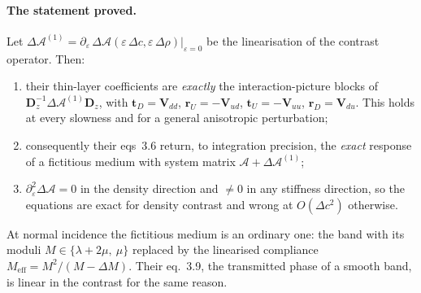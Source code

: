 \documentclass[11pt,a4paper]{article}
\newcommand{\bV}{\mathbf{V}}
\newcommand{\Aop}{\mathcal{A}}
\newcommand{\dA}{\Delta\mathcal{A}}
\begin{document}
\paragraph{The statement proved.}  Let $\dA^{(1)} =
\partial_\varepsilon\,\dA(\varepsilon\,\Delta c,\varepsilon\,\Delta\rho)\big|_{\varepsilon=0}$
be the linearisation of the contrast operator.  Then:
\begin{enumerate}
\item their thin-layer coefficients are \emph{exactly} the interaction-picture
      blocks of $\mathbf{D}_z^{-1}\dA^{(1)}\mathbf{D}_z$, with
      $\mathbf{t}_D = \bV_{dd}$, $\mathbf{r}_U = -\bV_{ud}$,
      $\mathbf{t}_U = -\bV_{uu}$, $\mathbf{r}_D = \bV_{du}$.  This holds at every
      slowness and for a general anisotropic perturbation;
\item consequently their eqs~3.6 return, to integration precision, the
      \emph{exact} response of a fictitious medium with system matrix
      $\Aop + \dA^{(1)}$;
\item $\partial^2_\varepsilon\dA = 0$ in the density direction and $\neq 0$ in
      any stiffness direction, so the equations are exact for density contrast
      and wrong at $O(\Delta c^2)$ otherwise.
\end{enumerate}
At normal incidence the fictitious medium is an ordinary one: the band with its
moduli $M\in\{\lambda+2\mu,\ \mu\}$ replaced by the linearised compliance
$M_{\text{eff}} = M^2/(M-\Delta M)$.  Their eq.~3.9, the transmitted phase of a
smooth band, is linear in the contrast for the same reason.
\end{document}
